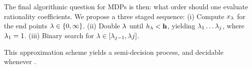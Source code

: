  The final algorithmic question for
MDPs is then: what order should one evaluate rationality coefficients.
We propose a three staged sequence:
(i) Compute $x_\lambda$ for the end points $\lambda \in \{0, \infty\}$.
(ii) Double $\lambda$ until $h_\lambda < \mathbf{h}$, yielding $\lambda_1\ldots \lambda_j$, where $\lambda_1 = 1$.
(iii) Binary search for $\lambda \in [\lambda_{j-1}, \lambda{j}]$.

This approximation scheme yields a semi-decision process, and decidable whenever .


